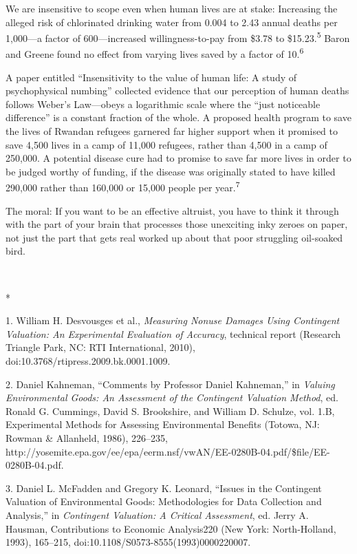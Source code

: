 {
 We are insensitive to scope even when human lives are at stake:
Increasing the alleged risk of chlorinated drinking water from 0.004 to
2.43 annual deaths per 1,000---a factor of 600---increased
willingness-to-pay from \$3.78 to \$15.23.\textsuperscript{5} Baron and
Greene found no effect from varying lives saved by a factor of
10.\textsuperscript{6}}

{
 A paper entitled ``Insensitivity to the value of
human life: A study of psychophysical numbing''
collected evidence that our perception of human deaths follows
Weber's Law---obeys a logarithmic scale where the
``just noticeable difference'' is a
constant fraction of the whole. A proposed health program to save the
lives of Rwandan refugees garnered far higher support when it promised
to save 4,500 lives in a camp of 11,000 refugees, rather than 4,500 in
a camp of 250,000. A potential disease cure had to promise to save far
more lives in order to be judged worthy of funding, if the disease was
originally stated to have killed 290,000 rather than 160,000 or 15,000
people per year.\textsuperscript{7}}

{
 The moral: If you want to be an effective altruist, you have to
think it through with the part of your brain that processes those
unexciting inky zeroes on paper, not just the part that gets real
worked up about that poor struggling oil-soaked bird.}

{\centering
 \ ~
\par}

{\centering
 *
\par}


\bigskip

{
 1. William H. Desvousges et al., \textit{Measuring Nonuse Damages
Using Contingent Valuation: An Experimental Evaluation of Accuracy},
technical report (Research Triangle Park, NC: RTI International, 2010),
doi:10.3768/rtipress.2009.bk.0001.1009.}

{
 2. Daniel Kahneman, ``Comments by Professor
Daniel Kahneman,'' in \textit{Valuing Environmental
Goods: An Assessment of the Contingent Valuation Method}, ed. Ronald G.
Cummings, David S. Brookshire, and William D. Schulze, vol. 1.B,
Experimental Methods for Assessing Environmental Benefits (Totowa, NJ:
Rowman \& Allanheld, 1986), 226--235,
http://yosemite.epa.gov/ee/epa/eerm.nsf/vwAN/EE-0280B-04.pdf/\$file/EE-0280B-04.pdf.}

{
 3. Daniel L. McFadden and Gregory K. Leonard,
``Issues in the Contingent Valuation of Environmental
Goods: Methodologies for Data Collection and
Analysis,'' in \textit{Contingent Valuation: A
Critical Assessment}, ed. Jerry A. Hausman, Contributions to Economic
Analysis220 (New York: North-Holland, 1993), 165--215,
doi:10.1108/S0573-8555(1993)0000220007.}

